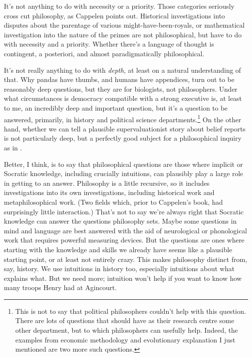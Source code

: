 It's not anything to do with necessity or a priority. Those categories seriously cross cut philosophy, as Cappelen points out. Historical investigations into disputes about the parentage of various might-have-been-royals, or mathematical investigation into the nature of the primes are not philosophical, but have to do with necessity and a priority. Whether there's a language of thought is contingent, a posteriori, and almost paradigmatically philosophical.

It's not really anything to do with \textit{depth}, at least on a natural understanding of that. Why pandas have thumbs, and humans have appendices, turn out to be reasonably deep questions, but they are for biologists, not philosophers. Under what circumstances is democracy compatible with a strong executive is, at least to me, an incredibly deep and important question, but it's a question to be answered, primarily, in history and political science departments.\footnote{This is not to say that political philosophers couldn't help with this question. There are lots of questions that should have as their research centre some other department, but to which philosophers can usefully help. Indeed, the examples from economic methodology and evolutionary explanation I just mentioned are two more such questions.} On the other hand, whether we can tell a plausible supervaluationist story about belief reports is not particularly deep, but a perfectly good subject for a philosophical inquiry as in \citet{Weatherson2003-WEAMMP}.

Better, I think, is to say that philosophical questions are those where implicit or Socratic knowledge, including crucially intuitions, can plausibly play a large role in getting to an answer. Philosophy is a little recursive, so it includes investigations into its own investigations, including historical work and metaphilosophical work. (Two fields which, prior to Cappelen's book, had surprisingly little interaction.) That's not to say we're always right that Socratic knowledge can answer the questions philosophy sets. Maybe some questions in mind and language are best answered with the aid of neurological or phonological work that requires powerful measuring devices. But the questions are ones where starting with the knowledge and skills we already have seems like a plausible starting point, or at least not entirely crazy. This makes philosophy distinct from, say, history. We use intuitions in history too, especially intuitions about what explains what. But we need more; intuition won't help if you want to know how many troops Henry had at Agincourt.

